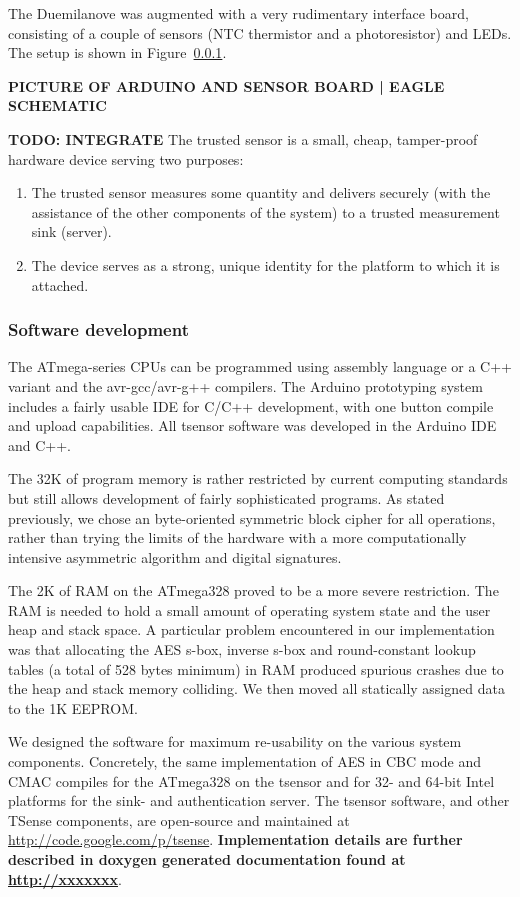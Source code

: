 The Duemilanove was augmented with a very rudimentary interface board, consisting of a couple of sensors (NTC thermistor and a photoresistor) and LEDs. The setup is shown in Figure~\ref{}.

\textbf{PICTURE OF ARDUINO AND SENSOR BOARD | EAGLE SCHEMATIC}

\textbf{TODO: INTEGRATE}
The trusted sensor is a small, cheap, tamper-proof hardware device serving two purposes:
\begin{enumerate}
\item The trusted sensor measures some quantity and delivers securely (with the assistance of the other components of the system) to a trusted measurement sink (server).
\item The device serves as a strong, unique identity for the platform to which it is attached.
\end{enumerate}

\subsubsection{Software development} 

The ATmega-series CPUs can be programmed using assembly language or a C++ variant and the avr-gcc/avr-g++ compilers. The Arduino prototyping system includes a fairly usable IDE for C/C++ development, with one button compile and upload capabilities. All tsensor software was developed in the Arduino IDE and C++.

The 32K of program memory is rather restricted by current computing standards but still allows development of fairly sophisticated programs. As stated previously, we chose an byte-oriented symmetric block cipher for all operations, rather than trying the limits of the hardware with a more computationally intensive asymmetric algorithm and digital signatures. 

The 2K of RAM on the ATmega328 proved to be a more severe restriction. The RAM is needed to hold a small amount of operating system state and the user heap and stack space. A particular problem encountered in our implementation was that allocating the AES s-box, inverse s-box and round-constant lookup tables (a total of 528 bytes minimum) in RAM produced spurious crashes due to the heap and stack memory colliding. We then moved all statically assigned data to the 1K EEPROM.

We designed the software for maximum re-usability on the various system components. Concretely, the same implementation of AES in CBC mode and CMAC compiles for the ATmega328 on the tsensor and for 32- and 64-bit Intel platforms for the sink- and authentication server. The tsensor software, and other TSense components, are open-source and maintained at \url{http://code.google.com/p/tsense}. \textbf{Implementation details are further described in doxygen generated documentation found at \url{http://xxxxxxx}}.

